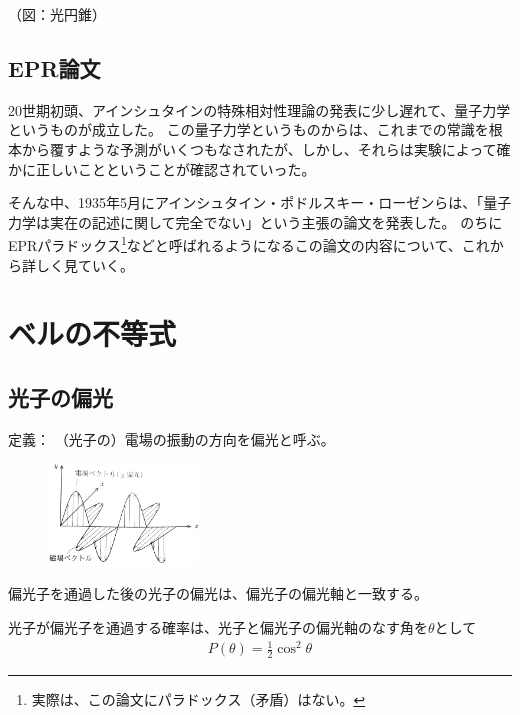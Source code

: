 \documentclass[10pt,b5paper,papersize,dvipdfmx]{jsbook}
\newcommand\karizu[1]{\begin{center}（図：#1）\end{center}}
\begin{document}
\karizu{光円錐}

%
\subsection{EPR論文}

20世期初頭、アインシュタインの特殊相対性理論の発表に少し遅れて、量子力学というものが成立した。
この量子力学というものからは、これまでの常識を根本から覆すような予測がいくつもなされたが、しかし、それらは実験によって確かに正しいことということが確認されていった。
\par
そんな中、1935年5月にアインシュタイン・ポドルスキー・ローゼンらは、「量子力学は実在の記述に関して完全でない」という主張の論文を発表した。
のちにEPRパラドックス\footnote{
  実際は、この論文にパラドックス（矛盾）はない。
}などと呼ばれるようになるこの論文の内容について、これから詳しく見ていく。
\par






\section{ベルの不等式}

%
\subsection{光子の偏光}

定義：
（光子の）電場の振動の方向を偏光と呼ぶ。

\begin{figure}[ht]
  \centering
  \includegraphics[width=40mm]{nkym/fig/henkou.jpeg}
\end{figure}

偏光子を通過した後の光子の偏光は、偏光子の偏光軸と一致する。

光子が偏光子を通過する確率は、光子と偏光子の偏光軸のなす角を$\theta$として
\begin{align*}
  P(\theta) = \frac12 \cos^2\theta
\end{align*}
\end{document}
